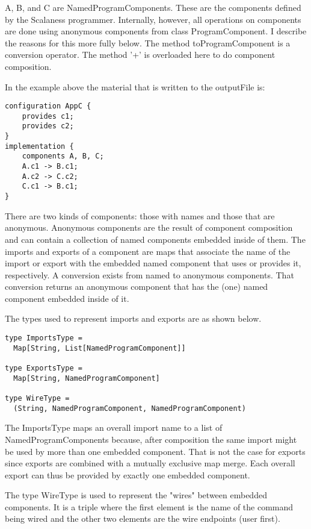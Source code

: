 A, B, and C are NamedProgramComponents. These are the components defined by the Scalaness
programmer. Internally, however, all operations on components are done using anonymous
components from class ProgramComponent. I describe the reasons for this more fully below. The
method toProgramComponent is a conversion operator. The method '+' is overloaded here to do
component composition.

In the example above the material that is written to the outputFile is:

\singlespace
\begin{lstlisting}[language=nesC]
configuration AppC {
    provides c1;
    provides c2;
}
implementation {
    components A, B, C;
    A.c1 -> B.c1;
    A.c2 -> C.c2;
    C.c1 -> B.c1;
}
\end{lstlisting}
\primaryspacing

There are two kinds of components: those with names and those that are anonymous. Anonymous
components are the result of component composition and can contain a collection of named
components embedded inside of them. The imports and exports of a component are maps that
associate the name of the import or export with the embedded named component that uses or
provides it, respectively. A conversion exists from named to anonymous components. That
conversion returns an anonymous component that has the (one) named component embedded inside of
it.

The types used to represent imports and exports are as shown below.

\singlespace
\begin{lstlisting}[language=scalaness]
type ImportsType =
  Map[String, List[NamedProgramComponent]]

type ExportsType =
  Map[String, NamedProgramComponent]

type WireType =
  (String, NamedProgramComponent, NamedProgramComponent)
\end{lstlisting}
\primaryspacing

The ImportsType maps an overall import name to a list of NamedProgramComponents because, after
composition the same import might be used by more than one embedded component. That is not the
case for exports since exports are combined with a mutually exclusive map merge. Each overall
export can thus be provided by exactly one embedded component.

The type WireType is used to represent the "wires" between embedded components. It is a triple
where the first element is the name of the command being wired and the other two elements are
the wire endpoints (user first).


